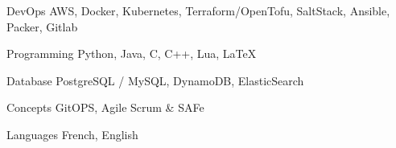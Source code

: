 

\begin{cvskills}

  \cvskill
    {DevOps} %
    {AWS, Docker, Kubernetes, Terraform/OpenTofu, SaltStack, Ansible, Packer, Gitlab} %

  \cvskill
    {Programming} %
    {Python, Java, C, C++, Lua, LaTeX} %

  \cvskill
    {Database} %
    {PostgreSQL / MySQL, DynamoDB, ElasticSearch} %

  \cvskill
    {Concepts} %
    {GitOPS, Agile Scrum \& SAFe} %

  \cvskill
    {Languages} %
    {French, English} %

\end{cvskills}
